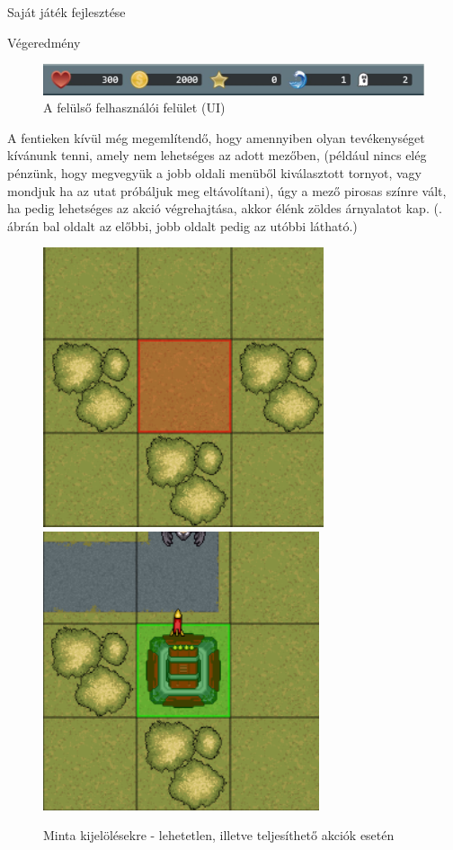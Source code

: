 \begin{MyChapter}{Saját játék fejlesztése}
\begin{MySection}{Végeredmény}
		\begin{figure}[h!]
			\centering
			\includegraphics[scale=0.575]{kepek/jatekHasznalat/felso_ui}
			\caption{A felülső felhasználói felület (UI) }
			\label{fig:jatekHasznalat:felso_ui}
		\end{figure}
	
		A fentieken kívül még megemlítendő, hogy amennyiben olyan tevékenységet kívánunk tenni, amely nem lehetséges az adott mezőben, (például nincs elég pénzünk, hogy megvegyük a jobb oldali menüből kiválasztott tornyot, vagy mondjuk ha az utat próbáljuk meg eltávolítani), úgy a mező pirosas színre vált, ha pedig lehetséges az akció végrehajtása, akkor élénk zöldes árnyalatot kap. (. ábrán bal oldalt az előbbi, jobb oldalt pedig az utóbbi látható.)
		
		\begin{figure}[h!]
			\centering
			\includegraphics[scale=0.898]{kepek/jatekHasznalat/minta_rossz_kijeloles}
			\includegraphics[scale=0.9]{kepek/jatekHasznalat/minta_jo_kijeloles}
			\caption{Minta kijelölésekre - lehetetlen, illetve teljesíthető akciók esetén}
			\label{fig:jatekHasznalat:kijeloles_minta}
		\end{figure}
		

\end{MySection}
\end{MyChapter}
